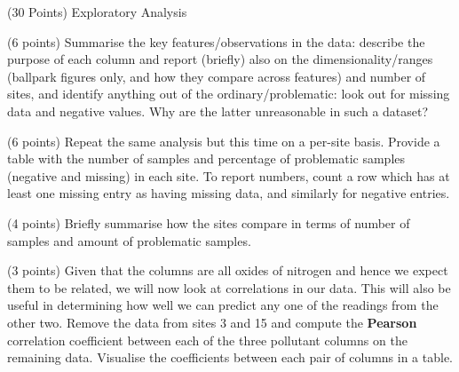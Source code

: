 \documentclass[12pt]{article}
\begin{document}
\begin{question}{\label{Q_EXPLORATORY}(30 Points) Exploratory Analysis}




\begin{subquestion}{(6 points) Summarise the key features/observations in the data: describe the purpose of each column and report (briefly) also on the dimensionality/ranges (ballpark figures only, and how they compare across features) and number of sites, and identify anything out of the ordinary/problematic: \ie look out for missing data and negative values. Why are the latter unreasonable in such a dataset? }






\end{subquestion}

\begin{subquestion}{(6 points) Repeat the same analysis but this time on a per-site basis. Provide a table with the number of samples and percentage of problematic samples (negative and missing) in each site. To report numbers, count a row which has at least one missing entry
as having missing data, and similarly for negative entries. }






\end{subquestion}

\begin{subquestion}{(4 points) Briefly summarise how the sites compare in terms of number of samples and amount of problematic samples.}






\end{subquestion}

\begin{subquestion}{(3 points) Given that the columns are all oxides of nitrogen and hence we expect them to be related, we will now look at correlations in our data. This will also be useful in determining how well we can predict any one of the readings from the other two. Remove the data from sites 3 and 15 and compute the \textbf{Pearson} correlation coefficient between each of the three pollutant columns on the remaining data. Visualise the coefficients between each pair of columns in a table.}




\end{subquestion}
\end{question}
\end{document}
